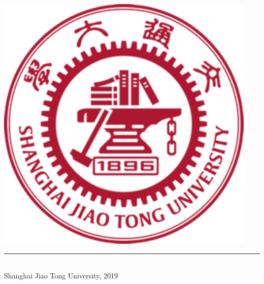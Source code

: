 \documentclass[titlepage, openany]{book}
\begin{document}
\begin{titlepage}
        \includegraphics[scale=0.4]{pictures/sjtu.png}\\
        \rule{\linewidth}{0.3mm}\\[0.4cm]
        \small{Shanghai Jiao Tong University, 2019}
    \end{titlepage}
    \cleardoublepage
    \setcounter{page}{1}
    \tableofcontents
    \cleardoublepage
    \setcounter{page}{1}
\end{document}
